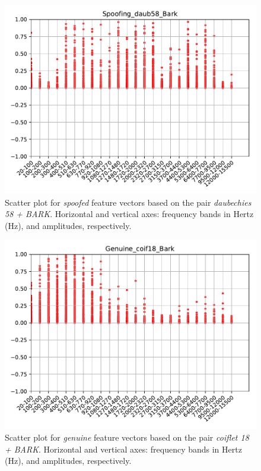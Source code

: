 		\begin{figure}[H]
			\centering
			\includegraphics[scale=.7]{images/results/barkVersusMel/Spoofing_daub58_Bark.pdf}
			\caption{Scatter plot for \textit{spoofed} feature vectors based on the pair \textit{daubechies 58 + BARK}. Horizontal and vertical axes: frequency bands in Hertz (Hz), and amplitudes, respectively.}
			\label{fig:spoofingdaub58bark}
		\end{figure}
		\begin{figure}[H]
			\centering
			\includegraphics[scale=.7]{images/results/barkVersusMel/Genuine_coif18_Bark.pdf}
			\caption{Scatter plot for \textit{genuine} feature vectors based on the pair \textit{coiflet 18 + BARK}. Horizontal and vertical axes: frequency bands in Hertz (Hz), and amplitudes, respectively.}
			\label{fig:livecoif18bark}
		\end{figure}
